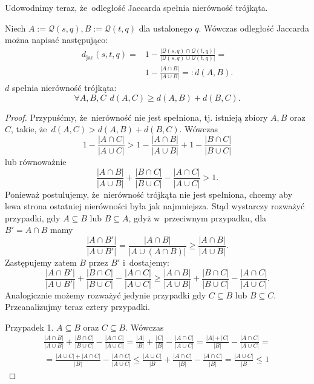 \documentclass{praca1}
\begin{document}
Udowodnimy teraz, że~odległość Jaccarda spełnia nierówność trójkąta.

\begin{lemma}
Niech $A := \mathcal{Q}(s,q), B:= \mathcal{Q}(t,q)$ dla ustalonego $q$. Wówczas odległość Jaccarda można napisać następująco:
\begin{align*}
d_{\mathrm{jac}}(s,t,q) = & 1 - \frac{|\mathcal{Q}(s,q) \cap \mathcal{Q}(t,q)|}{|\mathcal{Q}(s,q) \cup \mathcal{Q}(t,q)|} = \\ & 1 - \frac{|A\cap B|}{|A\cup B|}= :d(A, B).
\end{align*}
$d$ spełnia nierówność trójkąta:
$$
\forall A, B, C\ \ d(A, C) \geq d(A,B) + d(B, C).
$$
\end{lemma}

\begin{proof}
Przypuśćmy, że~nierówność nie jest spełniona, tj. istnieją zbiory $A, B$ oraz $C$, takie, że~$ d(A, C) > d(A,B) + d(B, C)$. Wówczas
$$
1 - \frac{|A\cap C|}{|A\cup C|} > 1 - \frac{|A\cap B|}{|A\cup B|} + 1 - \frac{|B\cap C|}{|B\cup C|}
$$
lub równoważnie
\begin{equation}
\label{eq:015}
\frac{|A\cap B|}{|A\cup B|} + \frac{|B\cap C|}{|B\cup C|} - \frac{|A\cap C|}{|A\cup C|} > 1.
\end{equation}
Ponieważ postulujemy, że~nierówność trójkąta nie jest spełniona, chcemy aby lewa strona ostatniej nierówności była jak najmniejsza. Stąd wystarczy rozważyć przypadki, gdy $A \subseteq B$ lub $B \subseteq A$, gdyż w~przeciwnym przypadku, dla $B' = A\cap B$ mamy
$$
\frac{|A\cap B'|}{|A\cup B'|} = \frac{|A\cap B|}{|A\cup (A \cap B)|} \geq \frac{|A\cap B|}{|A\cup B|}.
$$
Zastępujemy zatem $B$ przez $B'$ i~dostajemy:
$$
\frac{|A\cap B'|}{|A\cup B'|} + \frac{|B\cap C|}{|B\cup C|} - \frac{|A\cap C|}{|A\cup C|} \geq \frac{|A\cap B|}{|A\cup B|} + \frac{|B\cap C|}{|B\cup C|} - \frac{|A\cap C|}{|A\cup C|}.
$$
Analogicznie możemy rozważyć jedynie przypadki gdy $C \subseteq B$ lub $B \subseteq C$. Przeanalizujmy teraz cztery przypadki.

Przypadek 1. $A\subseteq B$ oraz $C \subseteq B$. Wówczas
\begin{multline*}
\frac{|A\cap B|}{|A\cup B|} + \frac{|B\cap C|}{|B\cup C|} - \frac{|A\cap C|}{|A\cup C|} = 
\frac{|A|}{|B|} + \frac{|C|}{|B|} - \frac{|A\cap C|}{|A\cup C|} =
\frac{|A| + |C|}{|B|} - \frac{|A\cap C|}{|A\cup C|} =\\
= \frac{|A\cup C| + |A\cap C|}{|B|} - \frac{|A\cap C|}{|A\cup C|} \leq 
\frac{|A\cup C|}{|B} + \frac{|A\cap C|}{|B|} - \frac{|A\cap C|}{|B|} = 
\frac{|A\cup C|}{|B}  \leq 1
\end{multline*}


\end{proof}
\end{document}

